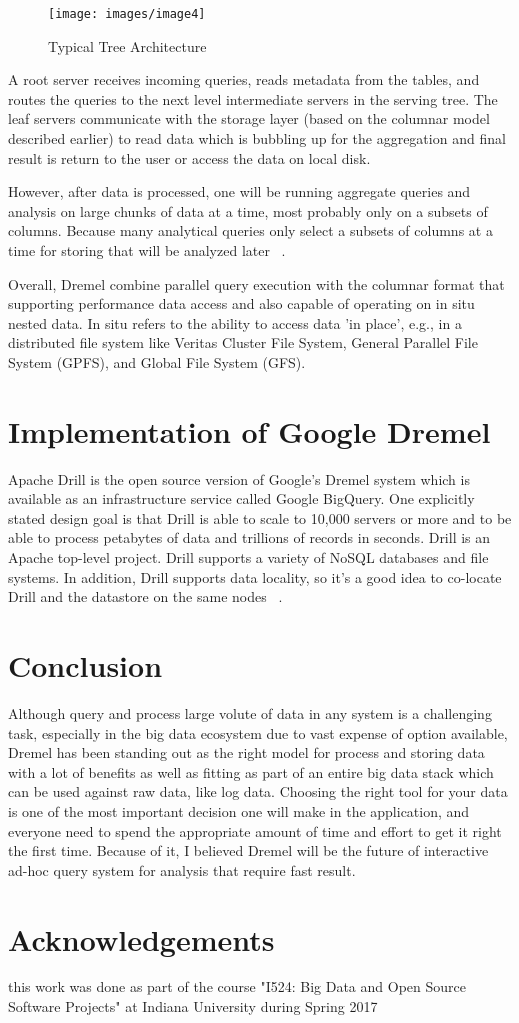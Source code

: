 \documentclass[9pt,twocolumn,twoside]{styles/osajnl}
\begin{document}
\begin{figure}[H]
 \centering
\texttt{[image: images/image4]}
\caption{Typical Tree Architecture ~\cite{book-hadoop}} 
\end{figure}

A root server receives incoming queries, reads metadata from the tables, and routes the queries to the next level intermediate servers in the serving tree. The leaf servers communicate with the storage layer (based on the columnar model described earlier) to read data which is bubbling up for the aggregation and final result is return to the user  or access the data on local disk. 

However, after data is processed, one will be running aggregate queries and analysis on large chunks of data at a time, most probably only on a subsets of columns. Because many analytical queries only select a subsets of columns at a time for storing that will be analyzed later ~\cite{book-hadoop}.

Overall, Dremel combine parallel query execution with the columnar format that supporting  performance data access and also capable of operating on in situ nested data. In situ refers to the ability to access data 'in place', e.g., in a distributed file system like Veritas Cluster File System,  General Parallel File System (GPFS), and  Global File System (GFS). 

\section{Implementation of Google Dremel }
Apache Drill is the open source version of Google's Dremel system which is available as an infrastructure service called Google BigQuery. One explicitly stated design goal is that Drill is able to scale to 10,000 servers or more and to be able to process petabytes of data and trillions of records in seconds. Drill is an Apache top-level project.  Drill supports a variety of NoSQL databases and file systems. In addition, Drill supports data locality, so it's a good idea to co-locate Drill and the datastore on the same nodes ~\cite{wiki-drill}.

\section{Conclusion}
 Although query and process large volute of data in any system is a challenging task, especially in the big data ecosystem due to vast expense of option available, Dremel has been standing out as the right model for process and storing data with a lot of benefits as well as fitting as part of an entire big data stack which can be used against raw data, like log data.  Choosing the right tool for your data is one of the most important decision one will make in the application, and everyone need to spend the appropriate amount of time and effort to get it right the first time. Because of it,  I believed Dremel will be the future of interactive ad-hoc query system for analysis that require fast result. 
 
 \section{Acknowledgements}
this work was done as part of the course "I524: Big Data and Open Source Software Projects" at Indiana University during Spring 2017




 
\end{document}
